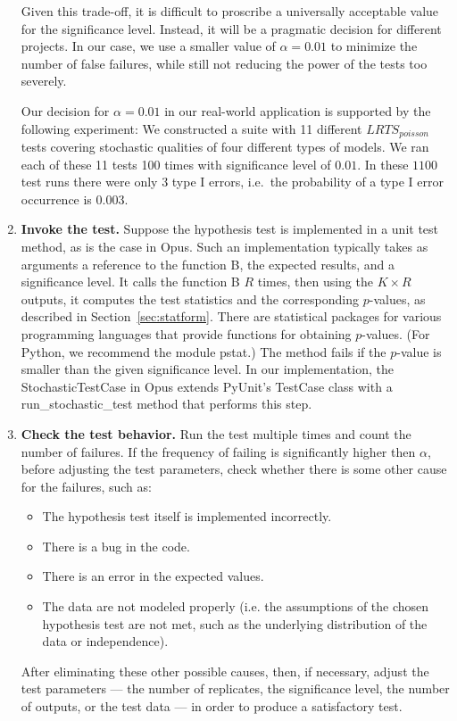 \documentclass{sig-alternate-preprint}
\begin{document}
\begin{enumerate}
Given this trade-off, it is difficult to proscribe a universally acceptable
value for the significance level.  Instead, it will be a pragmatic decision
for different projects.  In our case, we use a smaller value of
$\alpha=0.01$ to minimize the number of false failures, while still not 
reducing the power of the tests too severely.

Our decision for $\alpha=0.01$ in our real-world application is supported by
the following experiment: We constructed a suite with 11 different
$LRTS_{poisson}$ tests covering stochastic qualities of four different types
of models.  We ran each of these 11 tests 100 times with significance level of
$0.01$.  In these $1100$ test runs there were only 3 type I errors, i.e.\ the
probability of a type I error occurrence is $0.003$.

\item
{\bf Invoke the test.}  Suppose the hypothesis test is implemented in a
unit test method, as is the case in Opus. Such an implementation typically
takes as arguments a reference to the function B, the expected results, and
a significance level.  It calls the function B $R$ times, then using the
$K\times R$ outputs, it computes the test statistics and the corresponding
$p$-values, as described in Section~\ref{sec:statform}. There are
statistical packages for various programming languages that provide
functions for obtaining $p$-values.  (For Python, we recommend the module
pstat.) The method fails if the $p$-value is smaller than the given
significance level.  In our implementation, the StochasticTestCase in Opus
extends PyUnit's TestCase class with a run\_stochastic\_test method that
performs this step.

\item
{\bf Check the test behavior.}
Run the test multiple times and count the number of failures. If the frequency
of failing is significantly higher then $\alpha$, before adjusting the test
parameters, check whether there is some other cause for the failures, such as:
\begin{itemize}
\item The hypothesis test itself is implemented incorrectly.
\item There is a bug in the code.
\item There is an error in the expected values.
\item The data are not modeled properly (i.e. the assumptions of the
  chosen hypothesis test are not met, such as the underlying distribution of
  the data or independence). 
\end{itemize}

After eliminating these other possible causes, then, if necessary, adjust the
test parameters --- the number of replicates, the significance level, the
number of outputs, or the test data --- in order to produce a satisfactory
test.

\end{enumerate}
\end{document}

